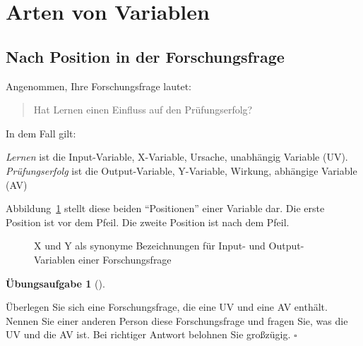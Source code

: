 \documentclass[
  letterpaper,
]{scrbook}
\theoremstyle{definition}
\newtheorem{exercise}{Übungsaufgabe}[chapter]
\theoremstyle{definition}
\theoremstyle{definition}
\theoremstyle{remark}
\begin{document}
\section{Arten von Variablen}\label{sec-arten-variablen}

\subsection{Nach Position in der
Forschungsfrage}\label{nach-position-in-der-forschungsfrage}

Angenommen, Ihre Forschungsfrage lautet:

\begin{quote}
Hat Lernen einen Einfluss auf den Prüfungserfolg?
\end{quote}

In dem Fall gilt:

\emph{Lernen} ist die Input-Variable, X-Variable, Ursache, unabhängig
Variable (UV). \emph{Prüfungserfolg} ist die Output-Variable,
Y-Variable, Wirkung, abhängige Variable (AV)

Abbildung~\ref{fig-ueberblick-fragen} stellt diese beiden
\enquote{Positionen} einer Variable dar. Die erste Position ist vor dem
Pfeil. Die zweite Position ist nach dem Pfeil.

\begin{figure}


\caption{\label{fig-ueberblick-fragen}X und Y als synonyme Bezeichnungen
für Input- und Output-Variablen einer Forschungsfrage}

\end{figure}%

\begin{exercise}[]\protect\hypertarget{exr-uvav}{}\label{exr-uvav}

Überlegen Sie sich eine Forschungsfrage, die eine UV und eine AV
enthält. Nennen Sie einer anderen Person diese Forschungsfrage und
fragen Sie, was die UV und die AV ist. Bei richtiger Antwort belohnen
Sie großzügig. \(\square\)

\end{exercise}
\end{document}
